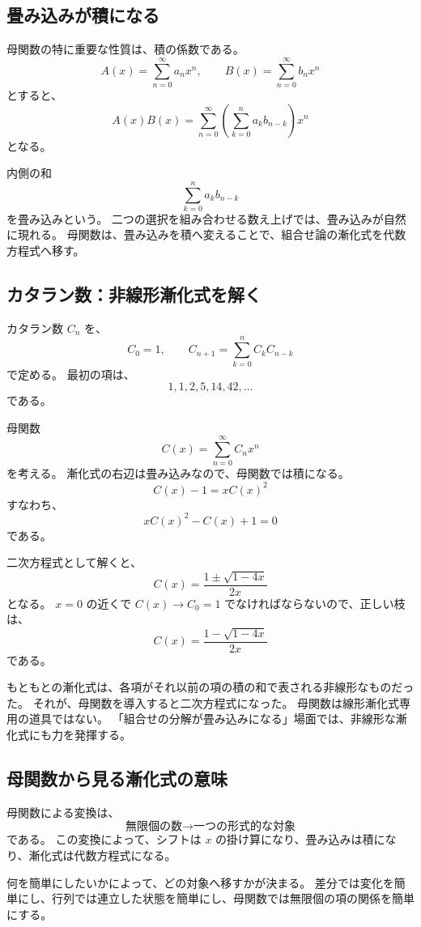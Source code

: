 \subsection{畳み込みが積になる}

母関数の特に重要な性質は、積の係数である。
\[
  A(x)=\sum_{n=0}^{\infty}a_nx^n,\qquad
  B(x)=\sum_{n=0}^{\infty}b_nx^n
\]
とすると、
\[
  A(x)B(x)
  =
  \sum_{n=0}^{\infty}
  \left(\sum_{k=0}^{n}a_kb_{n-k}\right)x^n
\]
となる。

内側の和
\[
  \sum_{k=0}^{n}a_kb_{n-k}
\]
を畳み込みという。
二つの選択を組み合わせる数え上げでは、畳み込みが自然に現れる。
母関数は、畳み込みを積へ変えることで、組合せ論の漸化式を代数方程式へ移す。

\subsection{カタラン数：非線形漸化式を解く}

カタラン数 $C_n$ を、
\[
  C_0=1,\qquad
  C_{n+1}=\sum_{k=0}^{n}C_kC_{n-k}
\]
で定める。
最初の項は、
\[
  1,1,2,5,14,42,\ldots
\]
である。

母関数
\[
  C(x)=\sum_{n=0}^{\infty}C_nx^n
\]
を考える。
漸化式の右辺は畳み込みなので、母関数では積になる。
\[
  C(x)-1=xC(x)^2
\]
すなわち、
\[
  xC(x)^2-C(x)+1=0
\]
である。

二次方程式として解くと、
\[
  C(x)=\frac{1\pm\sqrt{1-4x}}{2x}
\]
となる。
$x=0$ の近くで $C(x)\to C_0=1$ でなければならないので、正しい枝は、
\[
  C(x)=\frac{1-\sqrt{1-4x}}{2x}
\]
である。

もともとの漸化式は、各項がそれ以前の項の積の和で表される非線形なものだった。
それが、母関数を導入すると二次方程式になった。
母関数は線形漸化式専用の道具ではない。
「組合せの分解が畳み込みになる」場面では、非線形な漸化式にも力を発揮する。

\subsection{母関数から見る漸化式の意味}

母関数による変換は、
\[
  \text{無限個の数}
  \longrightarrow
  \text{一つの形式的な対象}
\]
である。
この変換によって、シフトは $x$ の掛け算になり、畳み込みは積になり、漸化式は代数方程式になる。

何を簡単にしたいかによって、どの対象へ移すかが決まる。
差分では変化を簡単にし、行列では連立した状態を簡単にし、母関数では無限個の項の関係を簡単にする。
